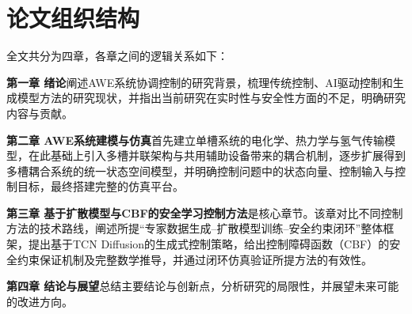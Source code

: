 \section{论文组织结构}

全文共分为四章，各章之间的逻辑关系如下：

\textbf{第一章 绪论}阐述AWE系统协调控制的研究背景，梳理传统控制、AI驱动控制和生成模型方法的研究现状，并指出当前研究在实时性与安全性方面的不足，明确研究内容与贡献。

\textbf{第二章 AWE系统建模与仿真}首先建立单槽系统的电化学、热力学与氢气传输模型，在此基础上引入多槽并联架构与共用辅助设备带来的耦合机制，逐步扩展得到多槽耦合系统的统一状态空间模型，并明确控制问题中的状态向量、控制输入与控制目标，最终搭建完整的仿真平台。

\textbf{第三章 基于扩散模型与CBF的安全学习控制方法}是核心章节。该章对比不同控制方法的技术路线，阐述所提``专家数据生成--扩散模型训练--安全约束闭环''整体框架，提出基于TCN Diffusion的生成式控制策略，给出控制障碍函数（CBF）的安全约束保证机制及完整数学推导，并通过闭环仿真验证所提方法的有效性。

\textbf{第四章 结论与展望}总结主要结论与创新点，分析研究的局限性，并展望未来可能的改进方向。
